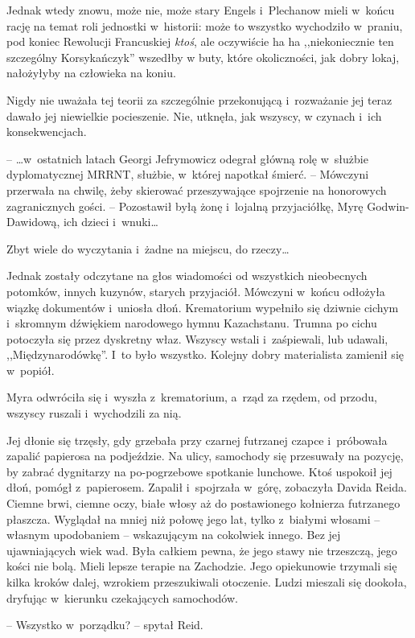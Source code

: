 \documentclass[oneside,polish,11pt,sfheadings]{mwbk}
\begin{document}
Jednak wtedy znowu, może nie, może stary Engels i~Plechanow mieli w~końcu rację na temat roli jednostki w~historii: może to wszystko
wychodziło w~praniu, pod koniec Rewolucji Francuskiej \textit{ktoś}, ale
oczywiście ha ha ,,niekoniecznie ten szczególny Korsykańczyk'' wszedłby
w buty, które okoliczności, jak dobry lokaj, nałożyłyby na człowieka na
koniu.

Nigdy nie uważała tej teorii za szczególnie przekonującą i~rozważanie
jej teraz dawało jej niewielkie pocieszenie. Nie, utknęła, jak wszyscy,
w czynach i~ich konsekwencjach.

-- \ldots w~ostatnich latach Georgi Jefrymowicz odegrał główną rolę w~służbie dyplomatycznej MRRNT, służbie, w~której napotkał śmierć. -- Mówczyni przerwała na chwilę, żeby skierować przeszywające spojrzenie na
honorowych zagranicznych gości. -- Pozostawił byłą żonę i~lojalną
przyjaciółkę, Myrę Godwin-Dawidową, ich dzieci i~wnuki\ldots

Zbyt wiele do wyczytania i~żadne na miejscu, do rzeczy\ldots

Jednak zostały odczytane na głos wiadomości od wszystkich nieobecnych
potomków, innych kuzynów, starych przyjaciół. Mówczyni w~końcu odłożyła
wiązkę dokumentów i~uniosła dłoń. Krematorium wypełniło się dziwnie
cichym i~skromnym dźwiękiem narodowego hymnu Kazachstanu. Trumna po
cichu potoczyła się przez dyskretny właz. Wszyscy wstali i~zaśpiewali,
lub udawali, ,,Międzynarodówkę''. I~to było wszystko. Kolejny dobry
materialista zamienił się w~popiół.

Myra odwróciła się i~wyszła z~krematorium, a~rząd za rzędem, od przodu,
wszyscy ruszali i~wychodzili za nią.

Jej dłonie się trzęsły, gdy grzebała przy czarnej futrzanej czapce i~próbowała zapalić papierosa na podjeździe. Na ulicy, samochody się
przesuwały na pozycję, by zabrać dygnitarzy na po-pogrzebowe spotkanie
lunchowe. Ktoś uspokoił jej dłoń, pomógł z~papierosem. Zapalił i~spojrzała w~górę, zobaczyła Davida Reida. Ciemne brwi, ciemne oczy,
białe włosy aż do postawionego kołnierza futrzanego płaszcza. Wyglądał
na mniej niż połowę jego lat, tylko z~białymi włosami -- własnym
upodobaniem -- wskazującym na cokolwiek innego. Bez jej ujawniających
wiek wad. Była całkiem pewna, że jego stawy nie trzeszczą, jego kości
nie bolą. Mieli lepsze terapie na Zachodzie. Jego opiekunowie trzymali
się kilka kroków dalej, wzrokiem przeszukiwali otoczenie. Ludzi mieszali
się dookoła, dryfując w~kierunku czekających samochodów.

-- Wszystko w~porządku? -- spytał Reid.
\end{document}
